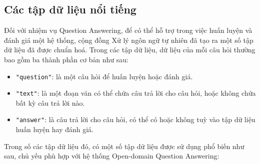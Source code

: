 \subsection{Các tập dữ liệu nổi tiếng}
Đối với nhiệm vụ Question Answering, để có thể hỗ trợ trong việc huấn luyện và đánh giá một hệ thống, cộng đồng Xử lý ngôn ngữ tự nhiên đã tạo ra một số tập dữ liệu đã được chuẩn hoá. Trong các tập dữ liệu, dữ liệu của mỗi câu hỏi thường bao gồm ba thành phần cơ bản như sau:

\begin{itemize}
    \item \lstinline{"question"}: là một câu hỏi để huấn luyện hoặc đánh giá.
    \item \lstinline{"text"}: là một đoạn văn có thể chứa câu trả lời cho câu hỏi, hoặc không chứa bất kỳ câu trả lời nào.
    \item \lstinline{"answer"}: là câu trả lời cho câu hỏi, có thể có hoặc không tuỳ vào tập dữ liệu huấn luyện hay đánh giá.
\end{itemize}

Trong số các tập dữ liệu đó, có một số tập dữ liệu được sử dụng phổ biến như sau, chủ yếu phù hợp với hệ thống Open-domain Question Answering:


